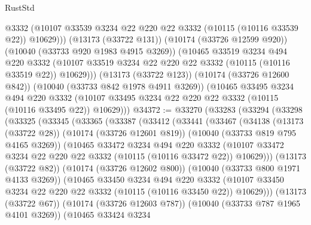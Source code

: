\begin{lexlean}{RustStd}
\begin{coremodule}
            @3332
            (@10107 @33539 @3234 @22 @220 @22 @3332 (@10115 (@10116 @33539 @22)) @10629)))
        (@13173 (@33722 @131))
        (@10174 (@33726 @12599 @920))
        (@10040 (@33733 @920 @1983 @4915 @3269))
        (@10465
          @33519
          @3234
          @494
          @220
          @3332
          (@10107 @33519 @3234 @22 @220 @22 @3332 (@10115 (@10116 @33519 @22)) @10629)))
      (@13173 (@33722 @123))
      (@10174 (@33726 @12600 @842))
      (@10040 (@33733 @842 @1978 @4911 @3269))
      (@10465
        @33495
        @3234
        @494
        @220
        @3332
        (@10107 @33495 @3234 @22 @220 @22 @3332 (@10115 (@10116 @33495 @22)) @10629)))
@34372 := @33270
    (@33283
      (@33294
        (@33298
          (@33325
            (@33345
              (@33365
                (@33387
                  (@33412
                    (@33441
                      (@33467
                        (@34138
                          (@13173 (@33722 @28))
                          (@10174 (@33726 @12601 @819))
                          (@10040 (@33733 @819 @795 @4165 @3269))
                          (@10465
                            @33472
                            @3234
                            @494
                            @220
                            @3332
                            (@10107
                              @33472
                              @3234
                              @22
                              @220
                              @22
                              @3332
                              (@10115 (@10116 @33472 @22))
                              @10629)))
                        (@13173 (@33722 @82))
                        (@10174 (@33726 @12602 @800))
                        (@10040 (@33733 @800 @1971 @4133 @3269))
                        (@10465
                          @33450
                          @3234
                          @494
                          @220
                          @3332
                          (@10107
                            @33450
                            @3234
                            @22
                            @220
                            @22
                            @3332
                            (@10115 (@10116 @33450 @22))
                            @10629)))
                      (@13173 (@33722 @67))
                      (@10174 (@33726 @12603 @787))
                      (@10040 (@33733 @787 @1965 @4101 @3269))
                      (@10465
                        @33424
                        @3234

\end{coremodule}
\end{lexlean}
